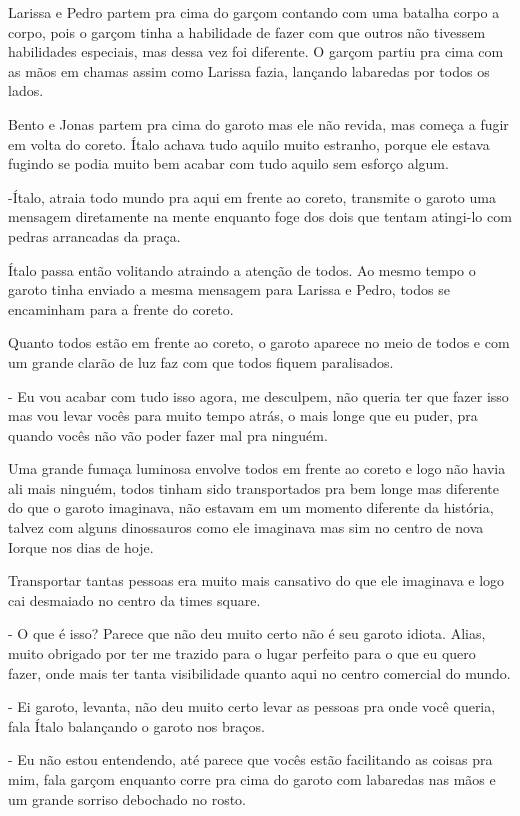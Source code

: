 Larissa e Pedro partem pra cima do garçom contando com uma batalha corpo a corpo, pois o garçom tinha a habilidade de fazer com que outros não tivessem habilidades especiais, mas dessa vez foi diferente. O garçom partiu pra cima com as mãos em chamas assim como Larissa fazia, lançando labaredas por todos os lados.

Bento e Jonas partem pra cima do garoto mas ele não revida, mas começa a fugir em volta do coreto. Ítalo achava tudo aquilo muito estranho, porque ele estava fugindo se podia muito bem acabar com tudo aquilo sem esforço algum.

-Ítalo, atraia todo mundo pra aqui em frente ao coreto, transmite o garoto uma mensagem diretamente na mente enquanto foge dos dois que tentam atingi-lo com pedras arrancadas da praça.

Ítalo passa então volitando atraindo a atenção de todos. Ao mesmo tempo o garoto tinha enviado a mesma mensagem para Larissa e Pedro, todos se encaminham para a frente do coreto.

Quanto todos estão em frente ao coreto, o garoto aparece no meio de todos e com um grande clarão de luz faz com que todos fiquem paralisados.

- Eu vou acabar com tudo isso agora, me desculpem, não queria ter que fazer isso mas vou levar vocês para muito tempo atrás, o mais longe que eu puder, pra quando vocês não vão poder fazer mal pra ninguém.

Uma grande fumaça luminosa envolve todos em frente ao coreto e logo não havia ali mais ninguém, todos tinham sido transportados pra bem longe mas diferente do que o garoto imaginava, não estavam em um momento diferente da história, talvez com alguns dinossauros como ele imaginava mas sim no centro de nova Iorque nos dias de hoje.

Transportar tantas pessoas era muito mais cansativo do que ele imaginava e logo cai desmaiado no centro da times square.

- O que é isso? Parece que não deu muito certo não é seu garoto idiota. Alias, muito obrigado por ter me trazido para o lugar perfeito para o que eu quero fazer, onde mais ter tanta visibilidade quanto aqui no centro comercial do mundo.

- Ei garoto, levanta, não deu muito certo levar as pessoas pra onde você queria, fala Ítalo balançando o garoto nos braços.

- Eu não estou entendendo, até parece que vocês estão facilitando as coisas pra mim, fala garçom enquanto corre pra cima do garoto com labaredas nas mãos e um grande sorriso debochado no rosto.

